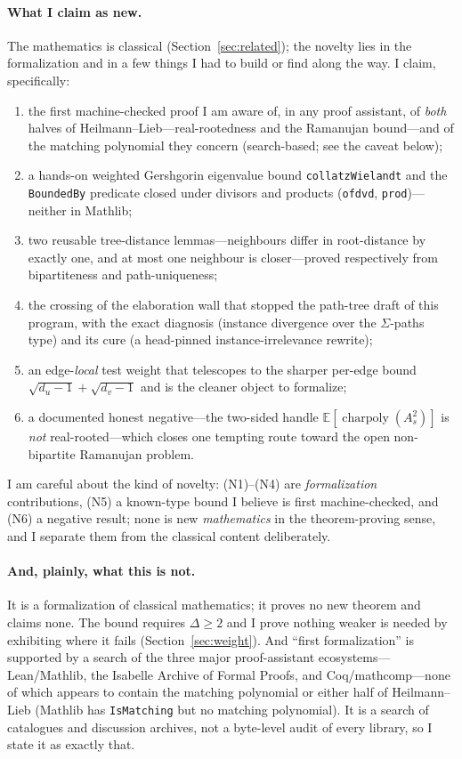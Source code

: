 \documentclass[11pt]{article}
\newcommand{\lean}[1]{{\def\_{\textunderscore\allowbreak}\texttt{#1}}}
\begin{document}
\paragraph{What I claim as new.} The mathematics is classical
(Section~\ref{sec:related}); the novelty lies in the formalization and in a few
things I had to build or find along the way. I claim, specifically:
\begin{enumerate}\itemsep1.5pt
\item[(N1)] the first machine-checked proof I am aware of, in any proof assistant,
  of \emph{both} halves of Heilmann--Lieb---real-rootedness and the Ramanujan
  bound---and of the matching polynomial they concern (search-based; see the caveat
  below);
\item[(N2)] a hands-on weighted Gershgorin eigenvalue bound \lean{collatzWielandt}
  and the \lean{BoundedBy} predicate closed under divisors and products
  (\lean{of\_dvd}, \lean{prod})---neither in Mathlib;
\item[(N3)] two reusable tree-distance lemmas---neighbours differ in root-distance
  by exactly one, and at most one neighbour is closer---proved respectively from
  bipartiteness and path-uniqueness;
\item[(N4)] the crossing of the elaboration wall that stopped the path-tree draft
  of this program, with the exact diagnosis (instance divergence over the
  $\Sigma$-paths type) and its cure (a head-pinned instance-irrelevance rewrite);
\item[(N5)] an edge-\emph{local} test weight that telescopes to the sharper
  per-edge bound $\sqrt{d_u-1}+\sqrt{d_v-1}$ and is the cleaner object to formalize;
\item[(N6)] a documented honest negative---the two-sided handle
  $\mathbb{E}[\operatorname{charpoly}(A_s^2)]$ is \emph{not} real-rooted---which
  closes one tempting route toward the open non-bipartite Ramanujan problem.
\end{enumerate}
I am careful about the kind of novelty: (N1)--(N4) are \emph{formalization}
contributions, (N5) a known-type bound I believe is first machine-checked, and
(N6) a negative result; none is new \emph{mathematics} in the theorem-proving
sense, and I separate them from the classical content deliberately.

\paragraph{And, plainly, what this is not.} It is a formalization of classical
mathematics; it proves no new theorem and claims none. The bound requires
$\Delta\ge2$ and I prove nothing weaker is needed by exhibiting where it fails
(Section~\ref{sec:weight}). And ``first formalization'' is supported by a search of
the three major proof-assistant ecosystems---Lean/Mathlib, the Isabelle Archive of
Formal Proofs, and Coq/mathcomp---none of which appears to contain the matching
polynomial or either half of Heilmann--Lieb (Mathlib has \lean{IsMatching} but no
matching polynomial). It is a search of catalogues and discussion archives, not a
byte-level audit of every library, so I state it as exactly that.
\end{document}
